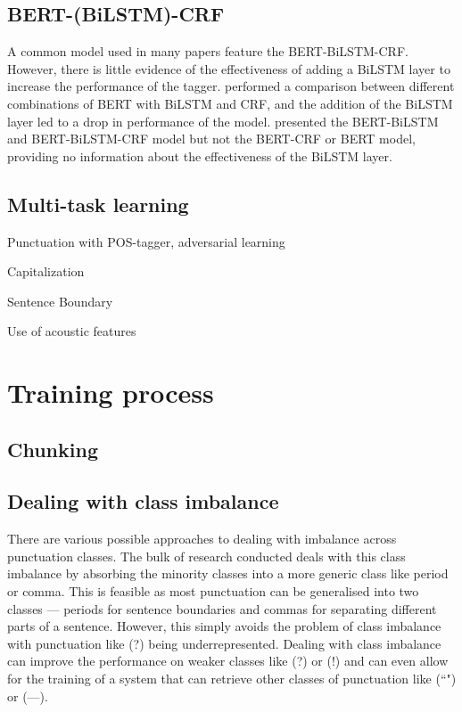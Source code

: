 \documentclass[a4paper]{article}
\begin{document}
\subsection{BERT-(BiLSTM)-CRF}
A common model used in many papers feature the BERT-BiLSTM-CRF. However, there is little evidence of the effectiveness of adding a BiLSTM layer to increase the performance of the tagger. \cite{bertcrf} performed a comparison between different combinations of BERT with BiLSTM and CRF, and the addition of the BiLSTM layer led to a drop in performance of the model. \cite{chinesebertbilstm} presented the BERT-BiLSTM and BERT-BiLSTM-CRF model but not the BERT-CRF or BERT model, providing no information about the effectiveness of the BiLSTM layer.

\subsection{Multi-task learning}
Punctuation with POS-tagger, adversarial learning

Capitalization

Sentence Boundary \cite{dynamiccrf}

Use of acoustic features


\section{Training process}
\subsection{Chunking}
\subsection{Dealing with class imbalance}
There are various possible approaches to dealing with imbalance across punctuation classes. The bulk of research conducted deals with this class imbalance by absorbing the minority classes into a more generic class like period or comma. This is feasible as most punctuation can be generalised into two classes --- periods for sentence boundaries and commas for separating different parts of a sentence. However, this simply avoids the problem of class imbalance with punctuation like (?) being underrepresented. Dealing with class imbalance can improve the performance on weaker classes like (?) or (!) and can even allow for the training of a system that can retrieve other classes of punctuation like (``") or (---). 
\end{document}
